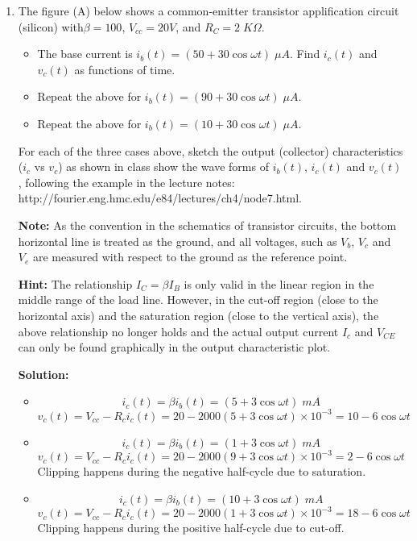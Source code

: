 \begin{enumerate}
\item The figure (A) below shows a common-emitter transistor 
applification circuit (silicon) with$\beta=100$, $V_{cc}=20V$, 
and $R_C=2\;K\Omega$. 
\begin{itemize}
\item The base current is $i_b(t)=(50+30 \cos \omega t)\;\mu A$.
Find $i_c(t)$ and $v_c(t)$ as functions of time.
\item Repeat the above for $i_b(t)=(90+30 \cos \omega t)\;\mu A$.
\item Repeat the above for $i_b(t)=(10+30 \cos \omega t)\;\mu A$.
\end{itemize}
For each of the three cases above, sketch the output (collector) 
characteristics ($i_c$ vs $v_c$) as shown in class show the wave
forms of $i_b(t)$, $i_c(t)$ and $v_c(t)$, following the example
in the lecture notes:
http://fourier.eng.hmc.edu/e84/lectures/ch4/node7.html.

{\bf Note:} As the convention in the schematics of transistor circuits,
the bottom horizontal line is treated as the ground, and all voltages,
such as $V_b$, $V_c$ and $V_e$ are measured with respect to the 
ground as the reference point.

{\bf Hint:} The relationship $I_C=\beta I_B$ is only valid in the
linear region in the middle range of the load line. However, in 
the cut-off region (close to the horizontal axis) and the saturation
region (close to the vertical axis), the above relationship no
longer holds and the actual output current $I_c$ and $V_{CE}$ can
only be found graphically in the output characteristic plot.


 {\bf Solution:}
 \begin{itemize}
 \item 
 \[ i_c(t)=\beta i_b(t)=(5+3\cos \omega t)\;mA \]
 \[ v_c(t)=V_{cc}-R_c i_c(t)=20-2000 (5+3\cos \omega t)\times 10^{-3}
    =10-6\cos \omega t  \]
 \item
 \[ i_c(t)=\beta i_b(t)=(1+3\cos \omega t)\;mA \]
 \[ v_c(t)=V_{cc}-R_c i_c(t)=20-2000 (9+3\cos \omega t)\times 10^{-3}
    =2-6\cos \omega t  \]
 Clipping happens during the negative half-cycle due to saturation.
 \item
 \[ i_c(t)=\beta i_b(t)=(10+3\cos \omega t)\;mA \]
 \[ v_c(t)=V_{cc}-R_c i_c(t)=20-2000 (1+3\cos \omega t)\times 10^{-3}
    =18-6\cos \omega t  \]
 Clipping happens during the positive half-cycle due to cut-off.
 \end{itemize}


\end{enumerate}
